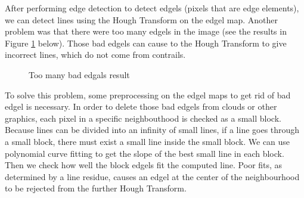 After performing edge detection to detect edgels (pixels that are edge elements),
we can detect lines using the Hough Transform on the edgel map. Another problem
was that there were too many edgels in the image (see the results in
Figure \ref{fig_edgels} below). Those bad edgels can cause to the Hough Transform
to give incorrect lines, which do not come from contrails.
\begin{figure}[htb!]
	\centering
	\begin{subfigure}{.5\textwidth}
	\end{subfigure}%
	\begin{subfigure}{.5\textwidth}
	\end{subfigure}
    \caption{Too many bad edgals result}
	\label{fig_edgels}
\end{figure}

To solve this problem, some preprocessing on the edgel maps to get rid of
bad edgel is necessary. In order to delete those bad edgels from clouds
or other graphics, each pixel in a specific neighbouthood is
checked as a small block. Because lines can be divided into an infinity of
small lines, if a line goes through a small block, there must exist a small
line inside the small block. We can use polynomial curve fitting to get
the slope of the best small line in each block. Then we check how well
the block edgels fit the computed line. Poor fits, as determined by a
line residue, causes an edgel at the center of the neighbourhood
to be rejected from the further Hough Transform.


